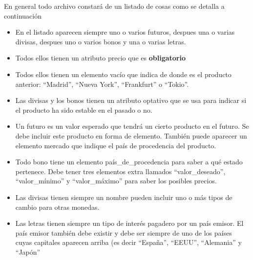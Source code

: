 \documentclass[letterpaper,10pt,spanish]{sphinxmanual}
\begin{document}
En general todo archivo constará de un listado de cosas como se detalla a continuación
\begin{itemize}
\item {} 
En el listado aparecen siempre uno o varios futuros, despues una o varias divisas, despues uno o varios bonos y una o varias letras.

\item {} 
Todos ellos tienen un atributo precio que es \textbf{obligatorio}

\item {} 
Todos ellos tienen un elemento vacío que indica  de donde es el producto anterior: ``Madrid'', ``Nueva York'', ``Frankfurt'' o ``Tokio''.

\item {} 
Las divisas y los bonos tienen un atributo optativo que se usa para indicar si el producto ha sido estable en el pasado o no.

\item {} 
Un futuro es un valor esperado que tendrá un cierto producto en el futuro. Se debe incluir este producto en forma de elemento. También puede aparecer un elemento mercado que indique el país de procedencia del producto.

\item {} 
Todo bono tiene un elemento país\_de\_procedencia para saber a qué estado pertenece. Debe tener tres elementos extra llamados ``valor\_deseado'', ``valor\_mínimo'' y ``valor\_máximo'' para saber los posibles precios.

\item {} 
Las divisas tienen siempre un nombre pueden incluir uno o más tipos de cambio para otras monedas.

\item {} 
Las letras tienen siempre un tipo de interés pagadero por un país emisor. El país emisor también debe existir y debe ser siempre de uno de los países cuyas capitales aparecen arriba (es decir ``España'', ``EEUU'', ``Alemania'' y ``Japón''

\end{itemize}
\end{document}
